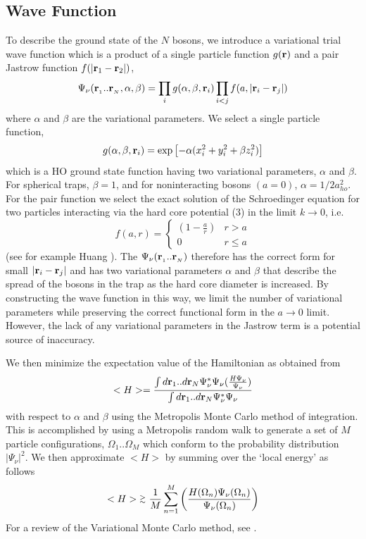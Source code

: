 \documentclass[aps,pra,twocolumn,groupedaddress]{revtex4}
\def\gapx{\lower 2pt \hbox{$\buildrel>\over{\scriptstyle{\sim}}$\ }}
\begin{document}
\subsection{Wave Function}
To describe the ground state of the $N$ bosons, we introduce a variational
trial wave function which is a product of a single particle
function $g({\bf r})$ and a pair Jastrow function \cite{jastrow} 
$f(|{\bf r}_1-{\bf r}_2|)$,
\begin{equation}
\Psi_\nu({\bf r}_{_1}..{\bf r}_{_N},\alpha,\beta) =
  \prod_{i}g(\alpha,\beta,{\bf r}_i)
  \prod_{i<j} f(a,|{\bf r}_i-{\bf r}_j|)
  \label{wvfn}
\end{equation}
where $\alpha$ and $\beta$ are the variational parameters.  
We select a single particle function, 
\begin{equation}
g(\alpha,\beta,{\bf r}_i) =
    \exp \left[-\alpha(x^2_i+y^2_i+\beta z^2_i)\right]
\end{equation}
which is a HO ground state function having two variational parameters,
$\alpha$ and $\beta$.  For spherical traps, $\beta=1$, and for noninteracting
bosons $(a=0)$, $\alpha=1/2a_{ho}^{2}$.  For the pair function we select
the exact solution
of the Schroedinger equation for two particles interacting via the hard core
potential (3) in the limit $k\rightarrow0$, i.e.
\begin{equation}
f(a,r) = \left\{
\begin{array}{ll}
    (1-\frac{a}{r}) & r > a \\
    0 & r \leq a
\end{array}
\right.
\label{jastrow_func}
\end{equation}
(see for example Huang \cite{huang63}). The $\Psi_\nu({\bf r}_{_1}..{\bf r}_{_N})$ therefore has the correct
form for small $|{\bf r}_i-{\bf r}_j|$ and has two variational
parameters $\alpha$ and $\beta$ that describe the spread of the 
bosons in the trap as the hard core diameter is increased.
By constructing the wave function in this way, we limit the number of 
variational parameters while preserving the correct functional form 
in the $a \rightarrow 0$ limit.  However, the lack of any variational parameters
in the Jastrow term is a potential source of inaccuracy. 

We then minimize the expectation value of the Hamiltonian as obtained from
$$ <H> = \frac {\int{d{\bf r}_1..d{\bf r}_N\Psi^*_{\nu}\Psi_{\nu}
(\frac{ {\it H}\Psi_{\nu} }{ \Psi_{\nu} }) } }
   {\int{d{\bf r}_1..d{\bf r}_N\Psi^*_{\nu}\Psi_{\nu}}}
$$
with respect to $\alpha$ and $\beta$ using the Metropolis Monte Carlo 
method of integration.
This is accomplished by using a Metropolis random walk \cite{metropolis}
to generate a set of $M$ particle configurations,
$\Omega_1..\Omega_M$ which
conform to the probability distribution $|\Psi_\nu|^2$. We then approximate
$<H>$ by summing over the `local energy' as follows
$$
<H> \gapx \frac{1}{M}\sum^M_{n=1} \left(\frac{H(\Omega_n)\Psi_\nu(\Omega_n)}
{\Psi_\nu(\Omega_n)}\right)
$$
For a review of the Variational Monte Carlo method, see \cite{vmc_Review}.
\end{document}
